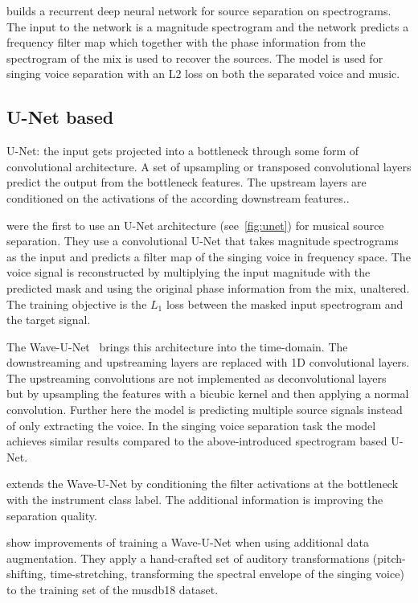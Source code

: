 \textcite{huangSingingVoice2014} builds a recurrent deep neural network for source separation on spectrograms. The input to the network is a magnitude spectrogram and the network predicts a frequency filter map which together with the phase information from the spectrogram of the mix is used to recover the sources. The model is used for singing voice separation with an L2 loss on both the separated voice and music.

\subsection{U-Net based}
\begin{marginfigure}
    \caption{U-Net: the input gets projected into a bottleneck through some form of convolutional architecture. A set of upsampling or transposed convolutional layers predict the output from the bottleneck features. The upstream layers are conditioned on the activations of the according downstream features..}%
    \label{fig:unet}
\end{marginfigure}
\textcite{janssonSinging2017} were the first to use an U-Net architecture (see~\cref{fig:unet}) for musical source separation. They use a convolutional U-Net that takes magnitude spectrograms as the input and predicts a filter map of the singing voice in frequency space. The voice signal is reconstructed by multiplying the input magnitude with the predicted mask and using the original phase information from the mix, unaltered. The training objective is the \(L_1\) loss between the masked input spectrogram and the target signal.

The Wave-U-Net~\cite{stollerWaveUNet2018} brings this architecture into the time-domain. The downstreaming and upstreaming layers are replaced with 1D convolutional layers. The upstreaming convolutions are not implemented as deconvolutional layers~\cite{dumoulinGuide2018} but by upsampling the features with a bicubic kernel and then applying a normal convolution. Further here the model is predicting multiple source signals instead of only extracting the voice. In the singing voice separation task the model achieves similar results compared to the above-introduced spectrogram based U-Net.

\textcite{slizovskaiaEndtoEnd2019} extends the Wave-U-Net by conditioning the filter activations at the bottleneck with the instrument class label. The additional information is improving the separation quality.

\textcite{cohen-hadriaImproving2019} show improvements of training a Wave-U-Net when using additional data augmentation. They apply a hand-crafted set of auditory transformations (pitch-shifting, time-stretching, transforming the spectral envelope of the singing voice) to the training set of the musdb18 dataset.

